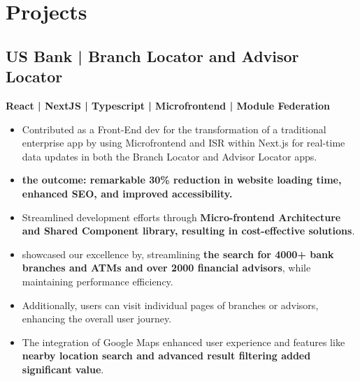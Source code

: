 \documentclass[letterpaper]{deedy-resume} %
\begin{document}
\begin{minipage}[t]{0.66\textwidth}
\sectionspace %







\vspace{-\topsep}


\section{Projects}


\subsection{US Bank | Branch Locator\texorpdfstring{\href{https://www.usbank.com/locations/search/}{\faExternalLink}}{External Link} and Advisor Locator\texorpdfstring{\href{https://www.usbank.com/wealth-management/find-an-advisor/}{\faExternalLink}}{External Link}}

\textbf{React | NextJS | Typescript | Microfrontend | Module Federation}  \\
\vspace{-\topsep}
\begin{itemize}
    \setlength\itemsep{-0.5em} %
    \item Contributed as a Front-End dev for the transformation of a traditional enterprise app by using Microfrontend and ISR within Next.js for real-time data updates in both the Branch Locator and Advisor Locator apps.
    \item \textbf{the outcome: remarkable 30\% reduction in website loading time, enhanced SEO, and improved accessibility.}
    \item Streamlined development efforts through \textbf{Micro-frontend Architecture and Shared Component library, resulting in cost-effective solutions}.
    \item showcased our excellence by, streamlining \textbf{the search for 4000+ bank branches and ATMs and over 2000 financial advisors}, while maintaining performance efficiency.
    \item Additionally, users can visit individual pages of branches or advisors, enhancing the overall user journey.
    \item The integration of Google Maps enhanced user experience and features like \textbf{nearby location search and advanced result filtering added significant value}.
\end{itemize}


\end{minipage}
\end{document}
